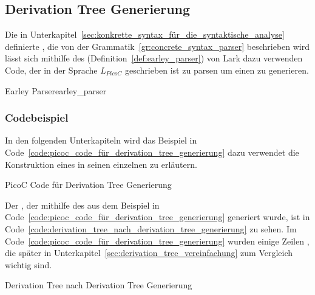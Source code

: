 
\subsection{Derivation Tree Generierung}

Die in Unterkapitel~\ref{sec:konkrette_syntax_für_die_syntaktische_analyse} definierte , die von der Grammatik~\ref{gr:concrete_syntax_parser} beschrieben wird lässt sich mithilfe des  (Definition~\ref{def:earley_parser}) von Lark dazu verwenden Code, der in der Sprache $L_{PicoC}$ geschrieben ist zu parsen um einen  zu generieren.

\begin{Definition}{Earley Parser}{earley_parser}

\end{Definition}

\subsubsection{Codebeispiel}
\label{sec:derivation_tree_generierung}

In den folgenden Unterkapiteln wird das Beispiel in Code~\ref{code:picoc_code_für_derivation_tree_generierung} dazu verwendet die Konstruktion eines  in seinen einzelnen  zu erläutern.

\begin{code}
  \centering
  \caption{PicoC Code für Derivation Tree Generierung}
  \label{code:picoc_code_für_derivation_tree_generierung}
\end{code}

Der , der mithilfe des  aus dem Beispiel in Code~\ref{code:picoc_code_für_derivation_tree_generierung} generiert wurde, ist in Code~\ref{code:derivation_tree_nach_derivation_tree_generierung} zu sehen. Im Code~\ref{code:picoc_code_für_derivation_tree_generierung} wurden einige Zeilen , die später in Unterkapitel~\ref{sec:derivation_tree_vereinfachung} zum Vergleich wichtig sind.

\begin{code}
  \centering
  \caption{Derivation Tree nach Derivation Tree Generierung}
  \label{code:derivation_tree_nach_derivation_tree_generierung}
\end{code}

